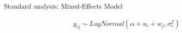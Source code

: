 \begin{frame}[fragile]{Standard analysis: Mixed-Effects Model}
	
	\begin{minipage}{.45\textwidth}
		\begin{equation*}
			\begin{aligned}	
				y_{ij} \sim LogNormal(\alpha + u_i + w_j, \sigma_{e}^2) \\
			\end{aligned}
		\end{equation*}
	\end{minipage}	
	\hfill
	\begin{minipage}{.45\textwidth}	
	\end{minipage}

\end{frame}




